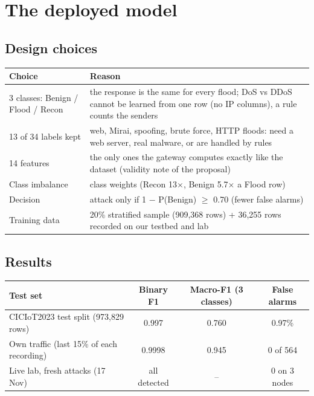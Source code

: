 \documentclass[11pt,a4paper]{article}
\newcommand{\dep}{\rowcolor{gray!18}}
\begin{document}
\section{The deployed model}

\subsection{Design choices}

\begin{center}
\begin{tabularx}{\linewidth}{P{3.6cm}L}
\toprule
Choice & Reason \\
 classes: Benign / Flood / Recon & the response is the same for every flood; DoS vs DDoS cannot be learned from one
row (no IP columns), a rule counts the senders \\
13 of 34 labels kept & web, Mirai, spoofing, brute force, HTTP floods: need a web server, real malware, or are
handled by rules \\
14 features & the only ones the gateway computes exactly like the dataset (validity note of the proposal) \\
Class imbalance & class weights (Recon 13$\times$, Benign 5.7$\times$ a Flood row) \\
Decision & attack only if 1 $-$ P(Benign) $\geq$ 0.70 (fewer false alarms) \\
Training data & 20\% stratified sample (909,368 rows) + 36,255 rows recorded on our testbed and lab \\
\bottomrule
\end{tabularx}
\end{center}

\subsection{Results}

\begin{center}
\begin{tabular}{lccc}
\toprule
Test set & Binary F1 & Macro-F1 (3 classes) & False alarms \\
\midrule
\dep CICIoT2023 test split (973,829 rows) & 0.997 & 0.760 & 0.97\% \\
\dep Own traffic (last 15\% of each recording) & 0.9998 & 0.945 & 0 of 564 \\
\dep Live lab, fresh attacks (17 Nov) & all detected & -- & 0 on 3 nodes \\
\bottomrule
\end{tabular}
\end{center}
\end{document}
